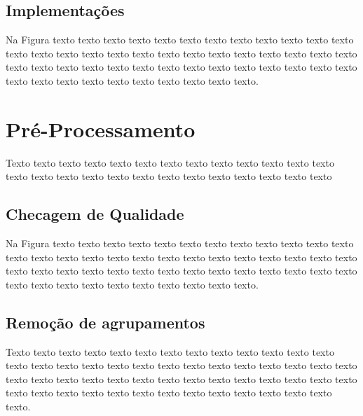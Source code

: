 \subsection{Implementações}
\label{sec:acidos_nucleicos}

Na Figura texto texto texto texto texto texto texto texto
texto texto texto texto texto texto texto texto texto texto texto texto texto
texto texto texto texto texto texto texto texto texto texto texto texto texto
texto texto texto texto texto texto texto texto texto texto texto texto texto
texto texto texto.

 
\section{Pré-Processamento}
\label{sec:fundamentos}

Texto texto texto texto texto texto texto texto texto texto texto texto texto
texto texto texto texto texto texto texto texto texto texto texto texto texto

\subsection{Checagem de Qualidade}
\label{sec:acidos_nucleicos}

Na Figura texto texto texto texto texto texto texto texto
texto texto texto texto texto texto texto texto texto texto texto texto texto
texto texto texto texto texto texto texto texto texto texto texto texto texto
texto texto texto texto texto texto texto texto texto texto texto texto texto
texto texto texto.

\subsection{Remoção de agrupamentos}
\label{sec:fundamentos}

Texto texto texto texto texto texto texto texto texto texto texto texto texto
texto texto texto texto texto texto texto texto texto texto texto texto texto
texto texto texto texto texto texto texto texto texto texto texto texto texto
texto texto texto texto texto texto texto texto texto texto texto texto texto
texto texto texto.

